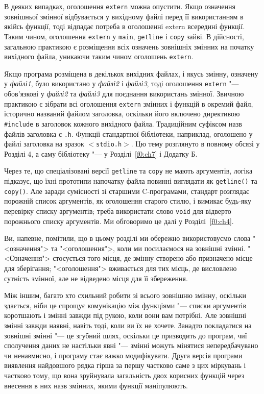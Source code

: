 \documentclass[a4paper,12pt]{book}
\begin{document}
  В деяких випадках, оголошення \texttt{extern} можна опустити. Якщо означення зовнішньої
  змінної відбувається у вихідному файлі перед її використанням в якійсь функції, тоді
  відпадає потреба в оголошенні extern всередині функції. Таким чином, оголошення
  \texttt{extern} у \texttt{main}, \texttt{getline} і \texttt{copy} зайві. В дійсності,
  загальною практикою є розміщення всіх означень зовнішніх змінних на початку вихідного
  файла, уникаючи таким чином оголошень \texttt{extern}.

  Якщо програма розміщена в декількох вихідних файлах, і якусь змінну, означену у
  \textit{файлі1}, було використано у \textit{файлі2} і \textit{файлі3}, тоді оголошення
  \texttt{extern} "--- обов'язкові у \textit{файлі2} та \textit{файлі3} для поєднання
  використань змінної. Звичною практикою є зібрати всі оголошення \texttt{extern} змінних
  і функцій в окремий файл, історично названий файлом заголовка, оскільки його включено
  директивою \texttt{\#include} в заголовок кожного вихідного файла. Традиційним суфіксом
  назв файлів заголовка є \texttt{.h}. Функції стандартної бібліотеки, наприклад,
  оголошено у файлі заголовка на зразок \texttt{\mbox{$<$}stdio.h\mbox{$>$}}. Цю тему
  розглянуто в повному обсязі у Розділі 4, а саму бібліотеку "--- у Розділі~\ref{f0:ch7} і
  Додатку Б.

  Через те, що спеціалізовані версії \texttt{getline} та \texttt{copy} не мають
  аргументів, логіка підказує, що їхні прототипи напочатку файла повинні виглядати як
  \texttt{getline()} та \texttt{copy()}. Але заради сумісності зі старшими C-програмами,
  стандарт розглядає порожній список аргументів, як оголошення старого стилю, і вимикає
  будь-яку перевірку списку аргументів; треба використати слово \texttt{void} для відверто
  порожнього списку аргументів. Ми обговоримо це далі у Розділі~\ref{f0:ch4}.

  Ви, напевне, помітили, що в цьому розділі ми обережно використовуємо слова
  "<означення"> та "<оголошення">, коли ми посилаємося на зовнішні
  змінні. "<Означення"> стосується того місця, де змінну створено або призначено
  місце для зберігання; "<оголошення"> вживається для тих місць, де висловлено
  сутність змінної, але не відведено місця для її збереження.

  Між іншим, багато хто схильний робити зі всього зовнішню змінну, оскільки здається, ніби
  це спрощує комунікацію між функціями "--- списки аргументів коротшають і змінні
  завжди під рукою, коли вони вам потрібні. Але зовнішні змінні завжди наявні, навіть
  тоді, коли ви їх не хочете. Занадто покладатися на зовнішні змінні "--- це згубний
  шлях, оскільки це призводить до програм, чиї сполучення даних не настільки явні "---
  змінні можуть мінятися непередбачувано чи ненавмисно, і програму стає важко
  модифікувати. Друга версія програми виявлення найдовшого рядка гірша за першу частково
  саме з цих міркувань і частково тому, що вона зруйнувала загальність двох корисних
  функцій через внесення в них назв змінних, якими функції маніпулюють.
\end{document}
